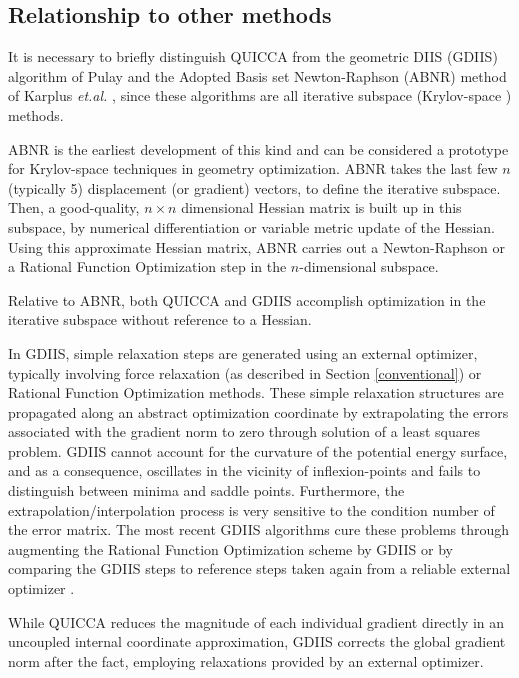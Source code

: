 \documentclass[prl,twocolumn,showpacs,twocolumngrid,superbib]{revtex4}
\begin{document}
\subsection{Relationship to other methods}
It is necessary to briefly distinguish QUICCA from the 
geometric DIIS (GDIIS) \cite{PPulay84} algorithm of Pulay and 
the Adopted Basis set Newton-Raphson (ABNR) method of Karplus 
{\it et.al.} \cite{BBrooks83}, since these algorithms are all iterative
subspace (Krylov-space \cite{YSaad92}) methods.

ABNR is the earliest development of this kind and can be considered
a prototype for Krylov-space techniques in geometry optimization.
ABNR takes the last few $n$ (typically 5) 
displacement (or gradient) vectors, to define
the iterative subspace. Then, a good-quality, 
$n\times n$ dimensional Hessian matrix is built up in this
subspace, by numerical differentiation or variable metric update
of the Hessian.
Using this approximate Hessian matrix,
ABNR carries out a Newton-Raphson or a Rational Function Optimization 
\cite{ABanerji85} step in the $n$-dimensional subspace. 

Relative to ABNR, both QUICCA and GDIIS accomplish optimization in the iterative
subspace without reference to a Hessian. 

In GDIIS, simple relaxation steps are generated using an external optimizer,
typically involving force relaxation (as described in Section \ref{conventional}) or 
Rational Function Optimization methods.  These
simple relaxation structures are propagated along an abstract optimization
coordinate by extrapolating the errors associated with the
gradient norm to zero through solution of a least squares problem.
GDIIS cannot account for the curvature of the potential
energy surface, and as a consequence,  oscillates in the vicinity of inflexion-points and fails to
distinguish between minima and saddle points. Furthermore, the extrapolation/interpolation
process is very sensitive to the condition number of the error matrix. The most recent GDIIS algorithms
cure these problems through augmenting the Rational Function Optimization scheme by GDIIS
\cite{FEckert97} or by comparing the GDIIS steps to reference steps
taken again from a reliable external optimizer \cite{OFarkas02}.

While QUICCA reduces the magnitude of each individual gradient directly in an uncoupled internal 
coordinate approximation, GDIIS corrects the global gradient norm after the fact, employing relaxations 
provided by an external optimizer.  
\end{document}
